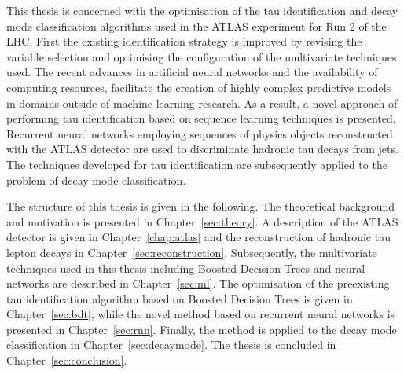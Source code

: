 This thesis is concerned with the optimisation of the tau identification and
decay mode classification algorithms used in the ATLAS experiment for Run 2 of
the LHC. First the existing identification strategy is improved by revising the
variable selection and optimising the configuration of the multivariate
techniques used. The recent advances in artificial neural networks and the
availability of computing resources, facilitate the creation of highly complex
predictive models in domains outside of machine learning research. As a result,
a novel approach of performing tau identification based on sequence learning
techniques is presented. Recurrent neural networks employing sequences of
physics objects reconstructed with the ATLAS detector are used to discriminate
hadronic tau decays from jets. The techniques developed for tau identification
are subsequently applied to the problem of decay mode classification.

The structure of this thesis is given in the following. The theoretical
background and motivation is presented in Chapter~\ref{sec:theory}. A
description of the ATLAS detector is given in Chapter~\ref{chap:atlas} and the
reconstruction of hadronic tau lepton decays in
Chapter~\ref{sec:reconstruction}. Subsequently, the multivariate techniques used
in this thesis including Boosted Decision Trees and neural networks are
described in Chapter~\ref{sec:ml}. The optimisation of the preexisting tau
identification algorithm based on Boosted Decision Trees is given in
Chapter~\ref{sec:bdt}, while the novel method based on recurrent neural networks
is presented in Chapter~\ref{sec:rnn}. Finally, the method is applied to the
decay mode classification in Chapter~\ref{sec:decaymode}. The thesis is
concluded in Chapter~\ref{sec:conclusion}.

